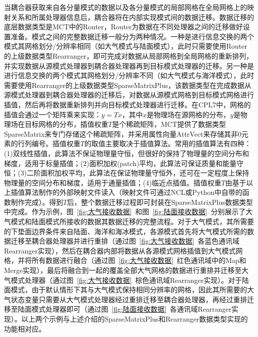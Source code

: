 当耦合器获取来自各分量模式的数据以及各分量模式的局部网格在全局网格上的映射关系和所属处理器信息后，耦合器将在内部实现模式间的数据迁移。数据迁移的底层数据类型是MCT中的Router，Router为数据在不同处理器之间的迁移做好设置准备。模式之间的完整数据迁移一般分为两种情况。一种是进行信息交换的两个模式其网格划分/分辨率相同（如大气模式与陆面模式），此时只需要使用Router的上级数据类型Rearranger，即可完成对数据从局部网格到全局网格的重新排列，并实现数据从源模式处理器到耦合器处理器再到目标模式处理器的迁移。另一种是进行信息交换的两个模式其网格划分/分辨率不同（如大气模式与海洋模式），此时需要使用Rearranger的上级数据类型SparseMatrixPlus，该数据类型在完成数据从源模式处理器到耦合器处理器的迁移后，对数据从源模式网格到目标模式网格进行插值，然后再将数据重新排列并向目标模式处理器进行迁移。在CPL7中，网格的插值会通过一个矩阵乘来实现：$y=Tx$，其中$x$是物理场在源网格的分布，$y$是物理场在目标网格的分布，插值权重$T$是个稀疏矩阵，MCT提供了数据类型SparseMatrix来专门存储这个稀疏矩阵，并采用属性向量AttrVect来存储其非0元素的行列编号。插值权重$T$的取值主要取决于插值算法。常用的插值算法有四种：(1)双线性插值，此算法不保证物理量守恒，但很好的保持了物理量的空间分布和梯度，适用于标量插值；(2)面积加权(patch)平均，此算法可保证质量和能量守恒；(3)二阶面积加权平均，此算法在保证物理量守恒外，还可在一定程度上保持物理量的空间分布和梯度，适用于通量插值；(4)临近点插值。插值权重$T$由基于以上插值算法制作的外部映射文件读入（映射文件可通过NCL或Python中自带的函数制作完成）。得到$T$后，整个数据迁移过程即可封装在SparseMatrixPlus数据类型中完成。作为示例，图~\ref{fig:大气接收数据}~和图~\ref{fig:陆面接收数据}~分别展示了大气模式和陆面模式所接收的数据其数据迁移的完整流程。对于大气模式，其所需要的下垫面边界条件来自陆面、海洋和海冰模式，各源模式首先将大气模式所需的数据迁移至耦合器处理器并进行重排（通过图~\ref{fig:大气接收数据}~各蓝色通讯域Rearranger实现），然后在耦合器内部将数据从各源模式网格插值到大气模式网格，并将所有数据进行融合（通过图~\ref{fig:大气接收数据}~红色通讯域中的Map和Merge实现），最后将融合到一起的覆盖全部大气网格的数据进行重排并迁移至大气模式处理器（通过图~\ref{fig:大气接收数据}~棕色通讯域Rearranger实现）。对于陆面模式，由于默认情形下其与大气模式保持相同分辨率的网格，因此其所需要的大气状态变量只需要从大气模式处理器经过重排迁移至耦合器处理器，再经过重排迁移至陆面模式处理器即可（通过图~\ref{fig:陆面接收数据}~各通讯域Rearranger实现）。以上两个示例与上述介绍的SparseMatrixPlus和Rearranger数据类型实现的功能相对应。


